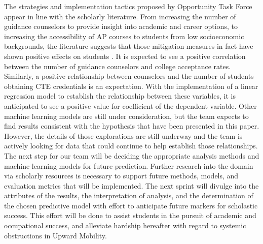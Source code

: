 The strategies and implementation tactics proposed by Opportunity Task Force appear in line with the scholarly literature. 
From increasing the number of guidance counselors to provide insight into academic and career options, to increasing the accessibility of AP courses to students from low socioeconomic backgrounds, the literature suggests that those mitigation measures in fact have shown positive effects on students \parencite[][]{castleman2014intensive}.
It is expected to see a positive correlation between the number of guidance counselors and college acceptance rates. 
Similarly, a positive relationship between counselors and the number of students obtaining CTE credentials is an expectation. 
With the implementation of a linear regression model to establish the relationship between these variables, it is anticipated to see a positive value for coefficient of the dependent variable. 
Other machine learning models are still under consideration, but the team expects to find results consistent with the hypothesis that have been presented in this paper. 
However, the details of those explorations are still underway and the team is actively looking for data that could continue to help establish those relationships. 
The next step for our team will be deciding the appropriate analysis methods and machine learning models for future prediction. 
Further research into the domain via scholarly resources is necessary to support future methods, models, and evaluation metrics that will be implemented.
The next sprint will divulge into the attributes of the results, the interpretation of analysis, and the determination of the chosen predictive model with effort to anticipate future markers for scholastic success.
This effort will be done to assist students in the pursuit of academic and occupational success, and alleviate hardship hereafter with regard to systemic obstructions in Upward Mobility.